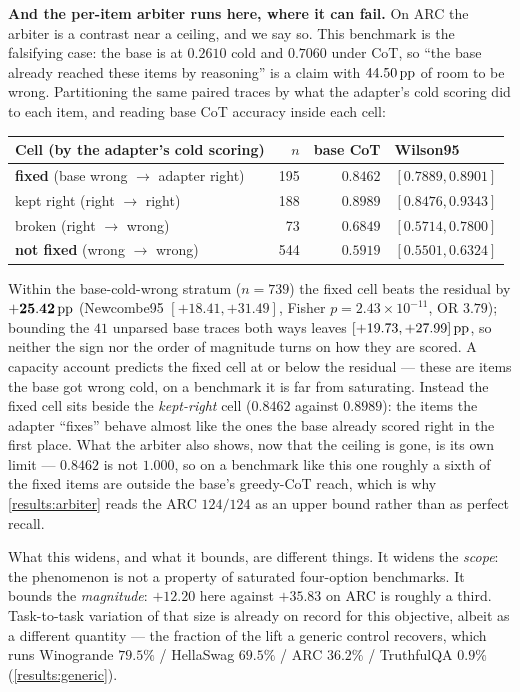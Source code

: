 \textbf{And the per-item arbiter runs here, where it can fail.} On ARC the arbiter is
a contrast near a ceiling, and we say so. This benchmark is the falsifying case: the
base is at $0.2610$ cold and $0.7060$ under CoT, so ``the base already reached these
items by reasoning'' is a claim with $44.50\,\mathrm{pp}$ of room to be wrong. Partitioning the
same paired traces by what the adapter's cold scoring did to each item, and reading
base CoT accuracy inside each cell:

\begin{center}\footnotesize
\begin{tabular}{lrrl}
\toprule
Cell (by the adapter's cold scoring) & $n$ & base CoT & Wilson95 \\
\midrule
\textbf{fixed} (base wrong $\rightarrow$ adapter right) & 195 & $\mathbf{0.8462}$ & $[0.7889, 0.8901]$ \\
kept right (right $\rightarrow$ right) & 188 & $0.8989$ & $[0.8476, 0.9343]$ \\
broken (right $\rightarrow$ wrong) & 73 & $0.6849$ & $[0.5714, 0.7800]$ \\
\textbf{not fixed} (wrong $\rightarrow$ wrong) & 544 & $\mathbf{0.5919}$ & $[0.5501, 0.6324]$ \\
\bottomrule
\end{tabular}
\end{center}

Within the base-cold-wrong stratum ($n{=}739$) the fixed cell beats the residual by
$\mathbf{+25.42\,\mathrm{pp}}$ (Newcombe95 $[+18.41, +31.49]$, Fisher $p=2.43\times10^{-11}$,
OR $3.79$); bounding the $41$ unparsed base traces both ways leaves
$[+19.73, +27.99]\,\mathrm{pp}$, so neither the sign nor the order of magnitude turns on how
they are scored. A capacity account predicts the fixed cell at or below the residual
--- these are items the base got wrong cold, on a benchmark it is far from
saturating. Instead the fixed cell sits beside the \emph{kept-right} cell
($0.8462$ against $0.8989$): the items the adapter ``fixes'' behave almost like the
ones the base already scored right in the first place. What the arbiter also shows,
now that the ceiling is gone, is its own limit --- $0.8462$ is not $1.000$, so on a
benchmark like this one roughly a sixth of the fixed items are outside the base's
greedy-CoT reach, which is why \cref{results:arbiter} reads the ARC $124/124$ as an
upper bound rather than as perfect recall.

What this widens, and what it bounds, are different things. It widens the
\emph{scope}: the phenomenon is not a property of saturated four-option benchmarks.
It bounds the \emph{magnitude}: $+12.20$ here against $+35.83$ on ARC is roughly a
third. Task-to-task variation of that size is already on record for this objective,
albeit as a different quantity --- the fraction of the lift a generic control
recovers, which runs Winogrande $79.5\%$ / HellaSwag $69.5\%$ / ARC $36.2\%$ /
TruthfulQA $0.9\%$ (\cref{results:generic}).

